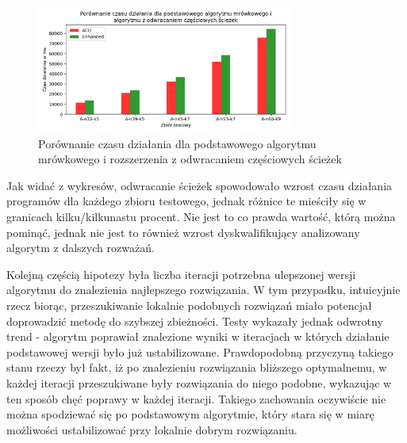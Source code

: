 \documentclass[10pt]{article}
\begin{document}
\begin{figure}[H]
    \centering
    \includegraphics[width=0.75\textwidth]{time_enhanced.png}
    \caption{Porównanie czasu działania dla podstawowego algorytmu mrówkowego i rozszerzenia z odwracaniem częściowych ścieżek}
    \label{fig:time_enhanced}
\end{figure}

Jak widać z wykresów, odwracanie ścieżek spowodowało wzrost czasu działania programów dla każdego zbioru testowego, jednak różnice te mieściły się w granicach kilku/kilkunastu procent. Nie jest to co prawda wartość, którą można pominąć, jednak nie jest to również wzrost dyskwalifikujący analizowany algorytm z dalszych rozważań.

Kolejną częścią hipotezy była liczba iteracji potrzebna ulepszonej wersji algorytmu do znalezienia najlepszego rozwiązania. W tym przypadku, intuicyjnie rzecz biorąc, przeszukiwanie lokalnie podobnych rozwiązań miało potencjał doprowadzić metodę do szybszej zbieżności. Testy wykazały jednak odwrotny trend - algorytm poprawiał znalezione wyniki w iteracjach w których działanie podstawowej wersji było już ustabilizowane. Prawdopodobną przyczyną takiego stanu rzeczy był fakt, iż po znalezieniu rozwiązania bliższego optymalnemu, w każdej iteracji przeszukiwane były rozwiązania do niego podobne, wykazując w ten sposób chęć poprawy w każdej iteracji. Takiego zachowania oczywiście nie można spodziewać się po podstawowym algorytmie, który stara się w miarę możliwości ustabilizować przy lokalnie dobrym rozwiązaniu.
\end{document}
